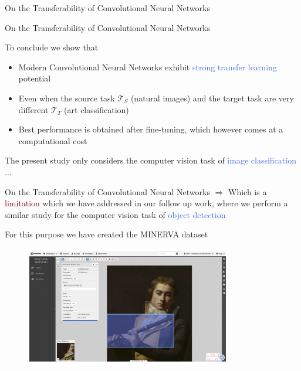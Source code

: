 \documentclass{beamer}
\begin{document}
\begin{frame}{On the Transferability of Convolutional Neural Networks}

	

\end{frame}


\begin{frame}{On the Transferability of Convolutional Neural Networks}

	\bigskip

	To conclude we show that
	
	\bigskip

	\begin{itemize}
		\item Modern Convolutional Neural Networks exhibit \textcolor{RoyalBlue}{strong transfer learning} potential
		\item Even when the source task $\mathcal{T}_S$ (natural images) and the target task are very different $\mathcal{T}_T$ (art classification)
		\item Best performance is obtained after fine-tuning, which however comes at a computational cost
	\end{itemize}

	\bigskip

	The present study only considers the computer vision task of \textcolor{RoyalBlue}{image classification} ...

\end{frame}

\begin{frame}{On the Transferability of Convolutional Neural Networks}
	\bigskip
	$\Rightarrow$ Which is a \textcolor{Maroon}{limitation} which we have addressed in our follow up work, where we perform a similar study for the computer vision task of \textcolor{RoyalBlue}{object detection}

	\bigskip
	
	For this purpose we have created the MINERVA dataset

	\begin{figure}
		\includegraphics[width=0.8\textwidth]{figures/cytomine_annotations}
	\end{figure}

\end{frame}
\end{document}
